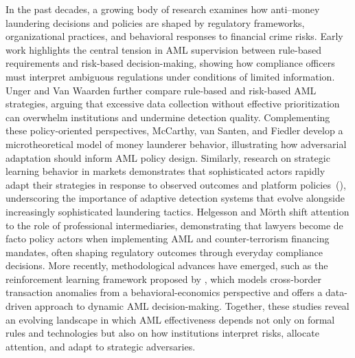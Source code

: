 \documentclass[11pt,english]{article}
\begin{document}
In the past decades, a growing body of research examines how anti–money laundering decisions and policies are shaped by regulatory frameworks, organizational practices, and behavioral responses to financial crime risks. Early work \parencite{ross2007money} highlights the central tension in AML supervision between rule-based requirements and risk-based decision-making, showing how compliance officers must interpret ambiguous regulations under conditions of limited information. Unger and Van Waarden \parencite*{unger2009dodge} further compare rule-based and risk-based AML strategies, arguing that excessive data collection without effective prioritization can overwhelm institutions and undermine detection quality. Complementing these policy-oriented perspectives, McCarthy, van Santen, and Fiedler \parencite*{mccarthy2015modeling} develop a microtheoretical model of money launderer behavior, illustrating how adversarial adaptation should inform AML policy design. Similarly, research on strategic learning behavior in markets demonstrates that sophisticated actors rapidly adapt their strategies in response to observed outcomes and platform policies~(\cite{xu2022ni}), underscoring the importance of adaptive detection systems that evolve alongside increasingly sophisticated laundering tactics. Helgesson and Mörth \parencite*{helgesson2016involuntary} shift attention to the role of professional intermediaries, demonstrating that lawyers become de facto policy actors when implementing AML and counter-terrorism financing mandates, often shaping regulatory outcomes through everyday compliance decisions. More recently, methodological advances have emerged, such as the reinforcement learning framework proposed by \parencite{rao2025reinforcement}, which models cross-border transaction anomalies from a behavioral-economics perspective and offers a data-driven approach to dynamic AML decision-making. Together, these studies reveal an evolving landscape in which AML effectiveness depends not only on formal rules and technologies but also on how institutions interpret risks, allocate attention, and adapt to strategic adversaries.
\end{document}
